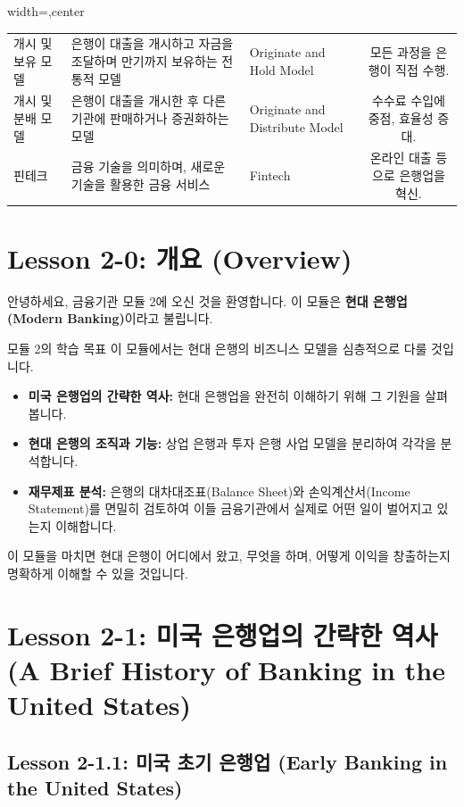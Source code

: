 \documentclass[11pt,a4paper]{article}
\theoremstyle{definition}
\begin{document}
\begin{adjustbox}{width=\textwidth,center}
\begin{tabular}{lllc}
개시 및 보유 모델 & 은행이 대출을 개시하고 자금을 조달하며 만기까지 보유하는 전통적 모델 & Originate and Hold Model & 모든 과정을 은행이 직접 수행. \\
개시 및 분배 모델 & 은행이 대출을 개시한 후 다른 기관에 판매하거나 증권화하는 모델 & Originate and Distribute Model & 수수료 수입에 중점, 효율성 증대. \\
핀테크 & 금융 기술을 의미하며, 새로운 기술을 활용한 금융 서비스 & Fintech & 온라인 대출 등으로 은행업을 혁신. \\
\bottomrule
\end{tabular}
\end{adjustbox}

\newpage
\section{Lesson 2-0: 개요 (Overview)}

안녕하세요, 금융기관 모듈 2에 오신 것을 환영합니다. 이 모듈은 \textbf{현대 은행업(Modern Banking)}이라고 불립니다.

\begin{summarybox}{모듈 2의 학습 목표}
이 모듈에서는 현대 은행의 비즈니스 모델을 심층적으로 다룰 것입니다.
\begin{itemize}
    \item \textbf{미국 은행업의 간략한 역사:} 현대 은행업을 완전히 이해하기 위해 그 기원을 살펴봅니다.
    \item \textbf{현대 은행의 조직과 기능:} 상업 은행과 투자 은행 사업 모델을 분리하여 각각을 분석합니다.
    \item \textbf{재무제표 분석:} 은행의 대차대조표(Balance Sheet)와 손익계산서(Income Statement)를 면밀히 검토하여 이들 금융기관에서 실제로 어떤 일이 벌어지고 있는지 이해합니다.
\end{itemize}
이 모듈을 마치면 현대 은행이 어디에서 왔고, 무엇을 하며, 어떻게 이익을 창출하는지 명확하게 이해할 수 있을 것입니다.
\end{summarybox}

\newpage
\section{Lesson 2-1: 미국 은행업의 간략한 역사 (A Brief History of Banking in the United States)}

\subsection{Lesson 2-1.1: 미국 초기 은행업 (Early Banking in the United States)}
\end{document}
